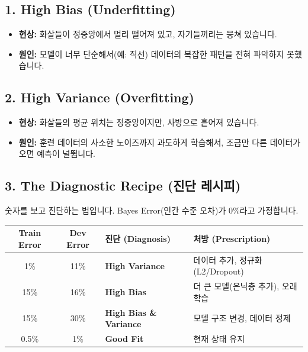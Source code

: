 \documentclass[11pt,a4paper]{book}
\theoremstyle{definition}
\begin{document}
\subsection{1. High Bias (Underfitting)}
\begin{itemize}
    \item \textbf{현상:} 화살들이 정중앙에서 멀리 떨어져 있고, 자기들끼리는 뭉쳐 있습니다.
    \item \textbf{원인:} 모델이 너무 단순해서(예: 직선) 데이터의 복잡한 패턴을 전혀 파악하지 못했습니다.
\end{itemize}

\subsection{2. High Variance (Overfitting)}
\begin{itemize}
    \item \textbf{현상:} 화살들의 평균 위치는 정중앙이지만, 사방으로 흩어져 있습니다.
    \item \textbf{원인:} 훈련 데이터의 사소한 노이즈까지 과도하게 학습해서, 조금만 다른 데이터가 오면 예측이 널뜁니다.
\end{itemize}

\subsection{3. The Diagnostic Recipe (진단 레시피)}
숫자를 보고 진단하는 법입니다. Bayes Error(인간 수준 오차)가 0\%라고 가정합니다.

\begin{diagnosisbox}[title={증상별 처방전}]
\begin{center}
\begin{tabular}{c|c|l|l}
\hline
\textbf{Train Error} & \textbf{Dev Error} & \textbf{진단 (Diagnosis)} & \textbf{처방 (Prescription)} \\ \hline
1\% & 11\% & \textbf{High Variance} & 데이터 추가, 정규화(L2/Dropout) \\ \hline
15\% & 16\% & \textbf{High Bias} & 더 큰 모델(은닉층 추가), 오래 학습 \\ \hline
15\% & 30\% & \textbf{High Bias \& Variance} & 모델 구조 변경, 데이터 정제 \\ \hline
0.5\% & 1\% & \textbf{Good Fit} & 현재 상태 유지 \\ \hline
\end{tabular}
\end{center}
\end{diagnosisbox}
\end{document}
